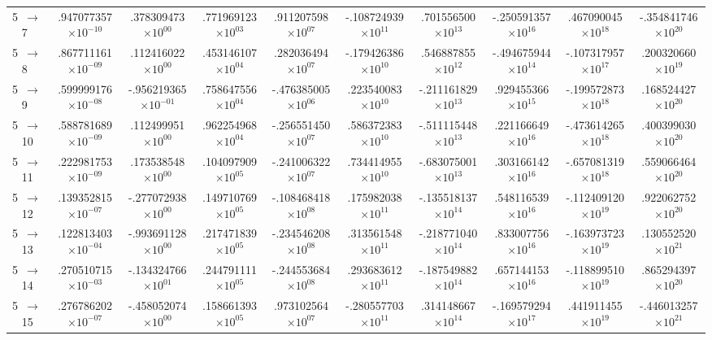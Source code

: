 \documentclass[reviewcopy]{elsarticle}
\begin{document}
\begin{landscape}
\begin{longtable}{lccccccccc}
 5~$\to$~ 7  &   .947077357$\times10^{-10}$ &  .378309473$\times10^{00}$ &  .771969123$\times10^{03}$ &  .911207598$\times10^{07}$ & -.108724939$\times10^{11}$ &  .701556500$\times10^{13}$ & -.250591357$\times10^{16}$ &  .467090045$\times10^{18}$ & -.354841746$\times10^{20}$ \\
 5~$\to$~ 8  &   .867711161$\times10^{-09}$ &  .112416022$\times10^{00}$ &  .453146107$\times10^{04}$ &  .282036494$\times10^{07}$ & -.179426386$\times10^{10}$ &  .546887855$\times10^{12}$ & -.494675944$\times10^{14}$ & -.107317957$\times10^{17}$ &  .200320660$\times10^{19}$ \\
 5~$\to$~ 9  &   .599999176$\times10^{-08}$ & -.956219365$\times10^{-01}$ &  .758647556$\times10^{04}$ & -.476385005$\times10^{06}$ &  .223540083$\times10^{10}$ & -.211161829$\times10^{13}$ &  .929455366$\times10^{15}$ & -.199572873$\times10^{18}$ &  .168524427$\times10^{20}$ \\
 5~$\to$~ 10 &   .588781689$\times10^{-09}$ &  .112499951$\times10^{00}$ &  .962254968$\times10^{04}$ & -.256551450$\times10^{07}$ &  .586372383$\times10^{10}$ & -.511115448$\times10^{13}$ &  .221166649$\times10^{16}$ & -.473614265$\times10^{18}$ &  .400399030$\times10^{20}$ \\
 5~$\to$~ 11 &   .222981753$\times10^{-09}$ &  .173538548$\times10^{00}$ &  .104097909$\times10^{05}$ & -.241006322$\times10^{07}$ &  .734414955$\times10^{10}$ & -.683075001$\times10^{13}$ &  .303166142$\times10^{16}$ & -.657081319$\times10^{18}$ &  .559066464$\times10^{20}$ \\
 5~$\to$~ 12 &   .139352815$\times10^{-07}$ & -.277072938$\times10^{00}$ &  .149710769$\times10^{05}$ & -.108468418$\times10^{08}$ &  .175982038$\times10^{11}$ & -.135518137$\times10^{14}$ &  .548116539$\times10^{16}$ & -.112409120$\times10^{19}$ &  .922062752$\times10^{20}$ \\
 5~$\to$~ 13 &   .122813403$\times10^{-04}$ & -.993691128$\times10^{00}$ &  .217471839$\times10^{05}$ & -.234546208$\times10^{08}$ &  .313561548$\times10^{11}$ & -.218771040$\times10^{14}$ &  .833007756$\times10^{16}$ & -.163973723$\times10^{19}$ &  .130552520$\times10^{21}$ \\
 5~$\to$~ 14 &   .270510715$\times10^{-03}$ & -.134324766$\times10^{01}$ &  .244791111$\times10^{05}$ & -.244553684$\times10^{08}$ &  .293683612$\times10^{11}$ & -.187549882$\times10^{14}$ &  .657144153$\times10^{16}$ & -.118899510$\times10^{19}$ &  .865294397$\times10^{20}$ \\
 5~$\to$~ 15 &   .276786202$\times10^{-07}$ & -.458052074$\times10^{00}$ &  .158661393$\times10^{05}$ &  .973102564$\times10^{07}$ & -.280557703$\times10^{11}$ &  .314148667$\times10^{14}$ & -.169579294$\times10^{17}$ &  .441911455$\times10^{19}$ & -.446013257$\times10^{21}$ \\

\end{longtable}
\end{landscape}
\end{document}
